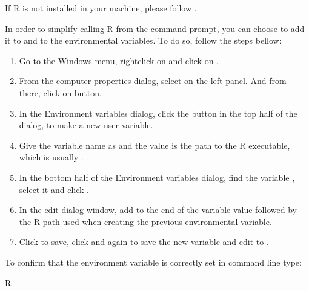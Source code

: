 \documentclass[letterpaper,10pt,english]{sphinxmanual}
\begin{document}
If R is not installed in your machine, please follow .

In order to simplify calling R from the command prompt, you can choose to add it to  and to the environmental variables. To do so, follow the steps bellow:
\begin{enumerate}
%
\item {} 
Go to the Windows menu, right\sphinxhyphen{}click on  and click on .

\item {} 
From the computer properties dialog, select  on the left panel. And from there, click on  button.

\item {} 
In the Environment variables dialog, click the  button in the top half of the dialog, to make a new user variable.

\item {} 
Give the variable name as  and the value is the path to the R executable, which is usually .

\item {} 
In the bottom half of the Environment variables dialog, find the variable , select it and click .

\item {} 
In the edit dialog window, add \sphinxcode{\sphinxupquote{;}} to the end of the variable value followed by the R path used when creating the previous environmental variable.

\item {} 
Click  to save, click  and  again to save the new variable and edit to .

\end{enumerate}

To confirm that the environment variable is correctly set in command line type:

\begin{sphinxVerbatim}[commandchars=\\\{\}]
\PYGZgt{}  \PYGZpc{}R\PYGZpc{}
\end{sphinxVerbatim}
\end{document}
